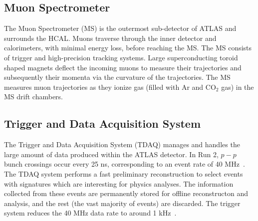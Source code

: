\subsection{Muon Spectrometer}
The Muon Spectrometer (MS) is the outermost sub-detector of ATLAS and surrounds the HCAL. Muons traverse through the inner detector and calorimeters, with minimal energy loss, before reaching the MS. The MS consists of trigger and high-precision tracking systems. Large superconducting toroid shaped magnets deflect the incoming muons to measure their trajectories and subsequently their momenta via the curvature of the trajectories. The MS measures muon trajectories as they ionize gas (filled with Ar and CO$_{2}$ gas) in the MS drift chambers.

\subsection{Trigger and Data Acquisition System}
The Trigger and Data Acquisition System (TDAQ) manages and handles the large amount of data produced within the ATLAS detector. In Run 2, $p-p$ bunch crossings occur every 25 ns, corresponding to an event rate of 40 MHz~\cite{Collaboration_2008}. The TDAQ system performs a fast preliminary reconstruction to select events with signatures which are interesting for physics analyses. The information collected from these events are permanently stored for offline reconstructon and analysis, and the rest (the vast majority of events) are discarded. The trigger system reduces the 40 MHz data rate to around 1 kHz~\cite{Collaboration_2008}.





